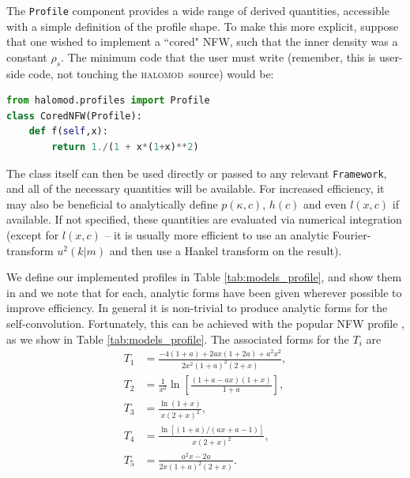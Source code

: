 \documentclass[5p,aas_macros]{elsarticle}
\newcommand{\halomod}{\textsc{halomod}}
\newcommand{\framework}{\texttt{Framework}}
\begin{document}
The \verb|Profile| component provides a wide range of derived quantities, accessible with a simple definition of the profile shape. To make this more explicit, suppose that one wished to implement a ``cored" NFW, such that the inner density was a constant $\rho_s$. The minimum code that the user must write (remember, this is user-side code, not touching the \halomod\ source) would be:
\begin{lstlisting}[language=Python]
from halomod.profiles import Profile
class CoredNFW(Profile):
	def f(self,x):
		return 1./(1 + x*(1+x)**2)
\end{lstlisting}
The class itself can then be used directly or passed to any relevant \framework, and all of the necessary quantities will be available. For increased efficiency, it may also be beneficial to analytically define $p(\kappa,c)$, $h(c)$ and even $l(x,c)$ if available. If not specified, these quantities are evaluated via numerical integration (except for $l(x,c)$ -- it is usually more efficient to use an analytic Fourier-transform $u^2(k|m)$ and then use a Hankel transform on the result).

We define our implemented profiles in Table \ref{tab:models_profile}, and show them in and we note that for each, analytic forms have been given wherever possible to improve efficiency. In general it is non-trivial to produce analytic forms for the self-convolution. Fortunately, this can be achieved with the popular NFW profile \citep{Sheth2001a}, as we show in Table \ref{tab:models_profile}. The associated forms for the $T_i$ are
\begin{subequations}
    \label{eq:nfw_t}
    \begin{align}
        T_1 &= \frac{-4(1+a)+2ax(1+2a)+a^2x^2}{2x^2(1+a)^2(2+x)},\\
        T_2 &= \frac{1}{x^2}\ln\left[\frac{(1+a-ax)(1+x)}{1+a}\right], \\
        T_3 &= \frac{\ln(1+x)}{x(2+x)^2}, \\
        T_4 &= \frac{\ln[(1+a)/(ax+a-1)]}{x(2+x)^2}, \\
        T_5 &= \frac{a^2x-2a}{2x(1+a)^2(2+x)}.
    \end{align}
\end{subequations}
\end{document}
